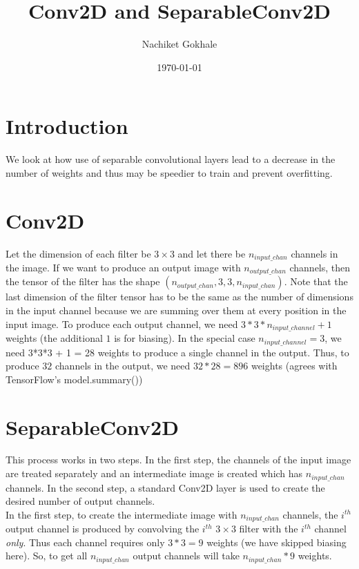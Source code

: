 \documentclass{article}
\begin{document}
\title{Conv2D and SeparableConv2D}
\author{Nachiket Gokhale}
\date{\today}
\maketitle
\section{Introduction}
We look at how use of separable convolutional layers lead to a decrease in the number of weights and thus may be speedier to train and prevent overfitting.
\section{\label{sect:conv2d}Conv2D}
Let the dimension of each filter be $3\times3$ and let there be $n_{input\_chan}$ channels in the image. If we want to produce an output image with $n_{output\_chan}$ channels, then the tensor of the filter has the shape $(n_{output\_chan},3,3,n_{input\_chan})$. Note that the last dimension of the filter tensor has to be the same as the number of dimensions in the input channel because we are summing over them at every position in the input image. To produce each output channel, we need $3*3*n_{input\_channel} + 1$ weights (the additional $1$ is for biasing). In the special case $n_{input\_channel}=3$, we need 3*3*3 + 1 = 28 weights to produce a single channel in the output. Thus, to produce $32$ channels in the output, we need $32*28=896$ weights (agrees with TensorFlow's model.summary())
\section{\label{sect:separableconv2d}SeparableConv2D}
This process works in two steps. In the first step, the channels of the input image are treated separately and an intermediate image is created which has $n_{input\_chan}$ channels. In the second step, a standard Conv2D layer is used to create the desired number of output channels. \\

In the first step, to create the intermediate image with $n_{input\_chan}$ channels, the $i^{th}$ output channel is produced by convolving the $i^{th}$ $3\times3$ filter with the $i^{th}$ channel \textit{only}. Thus each channel requires only $3*3=9$ weights (we have skipped biasing here). So, to get all $n_{input\_chan}$ output channels will take $n_{input\_chan}*9$ weights. \\
\end{document}
